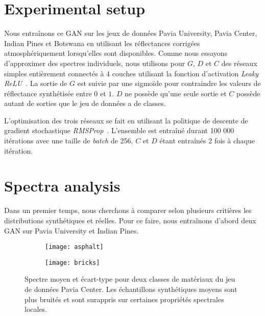 \section{Experimental setup}
\label{sec:experimental_setup}

Nous entraînons ce \gls{GAN} sur les jeux de données Pavia University, Pavia Center, Indian Pines et Botswana en utilisant les réflectances corrigées atmosphériquement lorsqu'elles sont disponibles. Comme nous essayons d'approximer des spectres individuels, nous utilisons pour $G$, $D$ et $C$ des réseaux simples entièrement connectés à 4 couches utilisant la fonction d'activation \emph{Leaky \gls{ReLU}}~\cite{maas_rectifier_2013}. La sortie de $G$ est suivie par une sigmoïde pour contraindre les valeurs de réflectance synthétisée entre $0$ et $1$. $D$ ne possède qu'une seule sortie et $C$ possède autant de sorties que le jeu de données a de classes.

L'optimisation des trois réseaux se fait en utilisant la politique de descente de gradient stochastique \emph{RMSProp}~\cite{rmsprop}. L'ensemble est entraîné durant 100 000 itérations avec une taille de \emph{batch} de 256, $C$ et $D$ étant entraînés 2 fois à chaque itération.

\section{Spectra analysis}
\label{sec:analysis}

Dans un premier temps, nous cherchons à comparer selon plusieurs critières les distributions synthétiques et réelles. Pour ce faire, nous entraînons d'abord deux \gls{GAN} sur Pavia University et Indian Pines.

\begin{figure}
\begin{subfigure}{0.5\textwidth}
\texttt{[image: asphalt]}
\end{subfigure}%
\begin{subfigure}{0.5\textwidth}
\texttt{[image: bricks]}
\end{subfigure}
\caption{Spectre moyen et écart-type pour deux classes de matériaux du jeu de données Pavia Center. Les échantillons synthétiques moyens sont plus bruités et sont surappris sur certaines propriétés spectrales locales.}
\label{fig:mean_spectra}
\end{figure}

